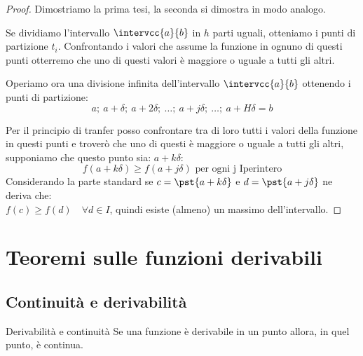 \begin{proof}
Dimostriamo la prima tesi, la seconda si dimostra in modo analogo.

\vspace{-10mm}                           %
\begin{minipage}{.56\textwidth}
Se dividiamo l'intervallo \(\intervcc{a}{b}\) in \(h\) parti uguali, 
otteniamo i punti di partizione \(t_i\). Confrontando i valori che assume 
la funzione in ognuno di questi punti otterremo che uno di questi valori è 
maggiore o uguale a tutti gli altri.

Operiamo ora una divisione infinita dell'intervallo \(\intervcc{a}{b}\)
ottenendo i punti di partizione: 
\[a;~a+\delta;~a+2\delta;~\dots;~a+j\delta;~\dots;~a+H\delta=b\]
\end{minipage}
\hfill
\begin{minipage}{.42\textwidth}
\vspace*{-25mm}                           %
\begin{center} \scalebox{.9}{\tweierstrass} \end{center}
\end{minipage}

\vspace{-10mm}                           %
Per il principio di tranfer posso confrontare tra di loro tutti i valori 
della funzione in questi punti e troverò che uno di questi è maggiore o 
uguale a tutti gli altri, supponiamo che questo punto sia: \(a+k\delta\):
\[f(a+k\delta) \geqslant f(a+j\delta) \text{ per ogni j Iperintero}\]
Considerando la parte standard 
se \(c=\pst{a+k\delta}\) e \(d=\pst{a+j\delta}\)
ne deriva che: \\
\(f(c) \geqslant f(d) \quad \forall d \in I\), quindi esiste (almeno) un 
massimo dell'intervallo.
\end{proof}

\section{Teoremi sulle funzioni derivabili}
\label{subsec:cont_definizione}

\subsection{Continuità e derivabilità}
\label{subsec:cont_contderiv}


\begin{newtheo}{Derivabilità e continuità}{}
Se una funzione è derivabile in un punto allora, in quel punto, è continua.
\end{newtheo}

